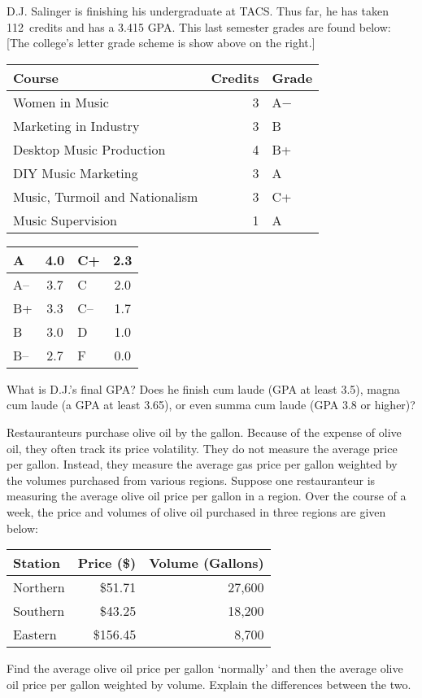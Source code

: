 \documentclass[11pt,letterpaper]{article}
\begin{document}
\newpage



 D.J. Salinger is finishing his undergraduate at TACS. Thus far, he has taken 112~credits and has a 3.415 GPA. This last semester grades are found below: [The college's letter grade scheme is show above on the right.] \par
	\begin{table}[!ht]
	\centering
	\begin{tabular}{lrl}
	Course & Credits & Grade \\ \hline
	Women in Music & 3 & A$-$ \\
	Marketing in Industry & 3 & B \\
	Desktop Music Production & 4 & B+ \\
	DIY Music Marketing & 3 & A \\
	Music, Turmoil and Nationalism & 3 & C+ \\
	Music Supervision & 1 & A
	\end{tabular} \hspace{1cm}
        \begin{tabular}{|l||c|l||c|} \hline
        A & 4.0 & C+ & 2.3 \\ \hline
        A-- & 3.7 & C & 2.0 \\ \hline
        B+ & 3.3 & C-- & 1.7 \\ \hline
        B & 3.0 & D & 1.0 \\ \hline
        B-- & 2.7 & F & 0.0 \\ \hline
        \end{tabular}
	\end{table} \par
What is D.J.'s final GPA? Does he finish cum laude (GPA at least 3.5), magna cum laude (a GPA at least 3.65), or even summa cum laude (GPA 3.8 or higher)?



\newpage



Restauranteurs purchase olive oil by the gallon. Because of the expense of olive oil, they often track its price volatility. They do not measure the average price per gallon. Instead, they measure the average gas price per gallon weighted by the volumes purchased from various regions. Suppose one restauranteur is measuring the average olive oil price per gallon in a region. Over the course of a week, the price and volumes of olive oil purchased in three regions are given below: \par
	\begin{table}[!ht]
	\centering
        \begin{tabular}{lrr} \hline
	Station & Price (\$) & Volume (Gallons) \\ \hline
	Northern & \$51.71 & 27,600 \\
	Southern & \$43.25 & 18,200 \\
	Eastern & \$156.45 & 8,700
        \end{tabular}
	\end{table} \par
Find the average olive oil price per gallon `normally' and then the average olive oil price per gallon weighted by volume. Explain the differences between the two. 
\end{document}
